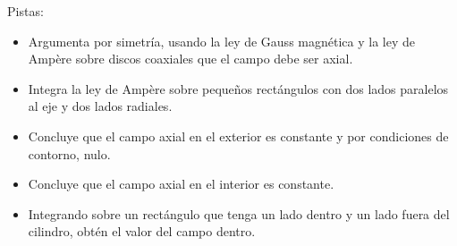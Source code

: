 \documentclass{exam}
\begin{document}
\begin{questions}
    Pistas:
    \begin{itemize}
    \item Argumenta por simetría, usando la ley de Gauss magnética y
      la ley de
      Ampère sobre discos coaxiales que el campo debe ser axial.
    \item Integra la ley de Ampère sobre pequeños rectángulos con dos
      lados paralelos al eje y dos lados radiales.
    \item Concluye que el campo axial en el exterior es constante y
      por condiciones de contorno, nulo.
    \item Concluye que el campo axial en el interior es constante.
    \item Integrando sobre un rectángulo que tenga un lado dentro y un
      lado fuera del cilindro, obtén el valor del campo dentro.
    \end{itemize}



  \end{questions}
\end{document}
